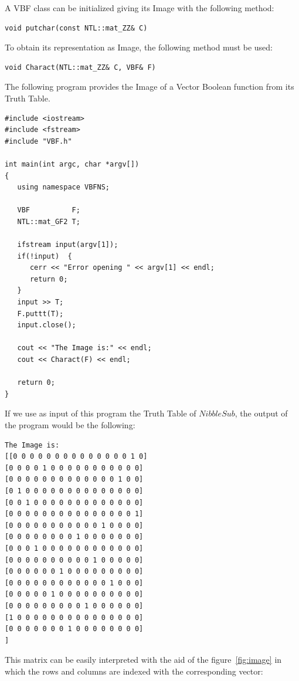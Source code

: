 A VBF class can be initialized giving its Image with the following method:

\begin{verbatim}
void putchar(const NTL::mat_ZZ& C)
\end{verbatim}

To obtain its representation as Image, the following method must be used:

\begin{verbatim}
void Charact(NTL::mat_ZZ& C, VBF& F)
\end{verbatim}

\begin{example}
The following program provides the Image of a Vector Boolean function from its Truth Table.

\begin{verbatim}
#include <iostream>
#include <fstream>
#include "VBF.h"

int main(int argc, char *argv[])
{
   using namespace VBFNS;

   VBF          F;
   NTL::mat_GF2 T;

   ifstream input(argv[1]);
   if(!input)  {
      cerr << "Error opening " << argv[1] << endl;
      return 0;
   }
   input >> T;
   F.puttt(T);
   input.close();

   cout << "The Image is:" << endl;
   cout << Charact(F) << endl;

   return 0;
}
\end{verbatim}

If we use as input of this program the Truth Table of $NibbleSub$, the output of the program would be the following:

\begin{verbatim}
The Image is:
[[0 0 0 0 0 0 0 0 0 0 0 0 0 0 1 0]
[0 0 0 0 1 0 0 0 0 0 0 0 0 0 0 0]
[0 0 0 0 0 0 0 0 0 0 0 0 0 1 0 0]
[0 1 0 0 0 0 0 0 0 0 0 0 0 0 0 0]
[0 0 1 0 0 0 0 0 0 0 0 0 0 0 0 0]
[0 0 0 0 0 0 0 0 0 0 0 0 0 0 0 1]
[0 0 0 0 0 0 0 0 0 0 0 1 0 0 0 0]
[0 0 0 0 0 0 0 0 1 0 0 0 0 0 0 0]
[0 0 0 1 0 0 0 0 0 0 0 0 0 0 0 0]
[0 0 0 0 0 0 0 0 0 0 1 0 0 0 0 0]
[0 0 0 0 0 0 1 0 0 0 0 0 0 0 0 0]
[0 0 0 0 0 0 0 0 0 0 0 0 1 0 0 0]
[0 0 0 0 0 1 0 0 0 0 0 0 0 0 0 0]
[0 0 0 0 0 0 0 0 0 1 0 0 0 0 0 0]
[1 0 0 0 0 0 0 0 0 0 0 0 0 0 0 0]
[0 0 0 0 0 0 0 1 0 0 0 0 0 0 0 0]
]
\end{verbatim}

This matrix can be easily interpreted with the aid of the figure~\ref{fig:image} in which the rows and columns are indexed with the corresponding vector:


\end{example}
